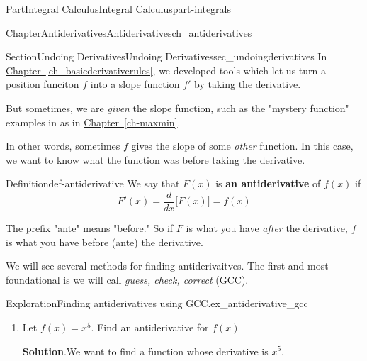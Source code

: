 \documentclass[oneside,10pt,]{tufte-book}
\newcommand{\blocktitlefont}{\relax}
\newcommand{\xreffont}{\relax}
\newcommand{\terminology}[1]{\textbf{#1}}
\numberwithin{equation}{chapter}
\newcommand{\ddx}[1]{ \dfrac{d}{dx} \Big[ #1 \Big]  }
\begin{document}
\begin{partptx}{Part}{Integral Calculus}{}{Integral Calculus}{}{}{part-integrals}
\renewcommand*{\partname}{Part}
%
\typeout{************************************************}
\typeout{************************************************}
%
\begin{chapterptx}{Chapter}{Antiderivatives}{}{Antiderivatives}{}{}{ch_antiderivatives}
\renewcommand*{\chaptername}{Chapter}
%
%
\typeout{************************************************}
\typeout{************************************************}
%
\begin{sectionptx}{Section}{Undoing Derivatives}{}{Undoing Derivatives}{}{}{sec_undoingderivatives}
In \hyperref[ch_basicderivativerules]{Chapter~{\xreffont\ref{ch_basicderivativerules}}\textendash{}{\xreffont\ref{ch_chainrule}}}, we developed tools which let us turn a position funciton \(f\) into a slope function \(f'\) by taking the derivative.%
\par
But sometimes, we are  \emph{given} the slope function, such as the "mystery function" examples in as in \hyperref[ch-maxmin]{Chapter~{\xreffont\ref{ch-maxmin}}}.%
\par
In other words, sometimes \(f\) gives the slope of some \emph{other} function. In this case, we want to know what the function was before taking the derivative.%
\begin{definition}{Definition}{}{def-antiderivative}%
We say that \(F(x)\) is \terminology{an antiderivative} of \(f(x)\) if%
\begin{equation*}
F'(x) = \ddx{F(x)} = f(x)
\end{equation*}
%
\par
The prefix "ante" means "before." So if \(F\) is what you have \emph{after} the derivative, \(f\) is what you have before (ante) the derivative.%
\end{definition}
We will see several methods for finding antiderivaitves. The first and most foundational is we will call \emph{guess, check, correct} (GCC).%
\begin{exploration}{Exploration}{Finding antiderivatives using GCC.}{ex_antiderivative_gcc}%
\begin{enumerate}[font=\bfseries,label=(\alph*),ref=\alph*]%
\item{}Let \(f(x)=x^5\). Find an antiderivative for \(f(x)\)%
\par\smallskip%
\noindent\textbf{\blocktitlefont Solution}.\hypertarget{ex_antiderivative_gcc-2-2}{}\quad{}We want to find a function whose derivative is \(x^5\).%

\end{enumerate}
\end{exploration}
\end{sectionptx}
\end{chapterptx}
\end{partptx}
\end{document}
